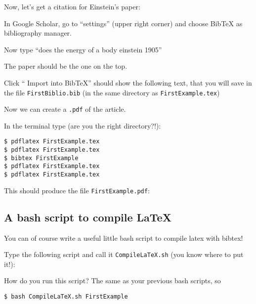 

Now, let's get a citation for Einstein's paper:

\begin{compactitem}[$\quad\star$]\itemsep4pt{}
\item In Google Scholar, go to ``settings'' (upper right corner) and choose
BibTeX as bibliography manager. 
  \item Now type ``does the energy of a body einstein 1905''
  \item The paper should be the one on the top.
  \item Click `` Import into BibTeX'' should show the following text, that you
will save in the file {\tt FirstBiblio.bib} (in the same directory as
{\tt FirstExample.tex})
{\tiny }
  \end{compactitem}

Now we can create a {\tt .pdf} of the article. 
\begin{compactitem}[$\quad\star$]\itemsep4pt{}
  \item In the terminal type (are you the right directory?!):
  \end{compactitem}

\begin{lstlisting}
$ pdflatex FirstExample.tex
$ pdflatex FirstExample.tex
$ bibtex FirstExample
$ pdflatex FirstExample.tex
$ pdflatex FirstExample.tex
\end{lstlisting}

This should produce the file {\tt FirstExample.pdf}:
    
\begin{center}
\setlength\fboxsep{0pt}
\setlength\fboxrule{0.5pt}
\end{center}

\subsection{A bash script to compile \LaTeX}

You can of course write a useful little bash script to compile latex 
with bibtex! 

Type the following script and call it {\tt CompileLaTeX.sh} (you know 
where to put it!):



How do you run this script? The same as your previous bash scripts, so 
\begin{lstlisting}	
$ bash CompileLaTeX.sh FirstExample
\end{lstlisting}

